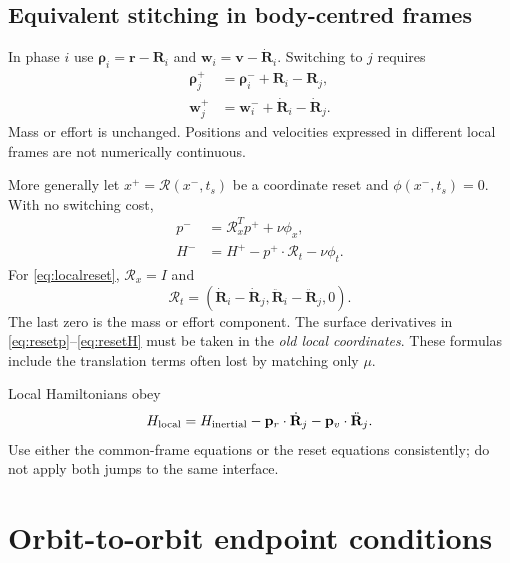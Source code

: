\documentclass[journal, a4paper]{IEEEtran}
\begin{document}
\subsection{Equivalent stitching in body-centred frames}
In phase $i$ use $\boldsymbol\rho_i=\mathbf r-\mathbf R_i$ and $\mathbf w_i=\mathbf v-\dot{\mathbf R}_i$. Switching to $j$ requires
\begin{align}
 \boldsymbol\rho_j^+&=\boldsymbol\rho_i^-+\mathbf R_i-\mathbf R_j,\nonumber\\
 \mathbf w_j^+&=\mathbf w_i^-+\dot{\mathbf R}_i-\dot{\mathbf R}_j.
 \label{eq:localreset}
\end{align}
Mass or effort is unchanged. Positions and velocities expressed in different local frames are not numerically continuous.

More generally let $x^+=\mathcal R(x^-,t_s)$ be a coordinate reset and $\phi(x^-,t_s)=0$. With no switching cost,
\begin{align}
 p^-&=\mathcal R_x^T p^++\nu\phi_x,\label{eq:resetp}\\
 H^-&=H^+-p^+\cdot\mathcal R_t-\nu\phi_t.
 \label{eq:resetH}
\end{align}
For \eqref{eq:localreset}, $\mathcal R_x=I$ and
\begin{equation}
 \mathcal R_t=(\dot{\mathbf R}_i-\dot{\mathbf R}_j,
                   \ddot{\mathbf R}_i-\ddot{\mathbf R}_j,0).
\end{equation}
The last zero is the mass or effort component. The surface derivatives in \eqref{eq:resetp}--\eqref{eq:resetH} must be taken in the \emph{old local coordinates}. These formulas include the translation terms often lost by matching only $\mu$.

Local Hamiltonians obey
\begin{equation}
 H_{\rm local}=H_{\rm inertial}
       -\mathbf p_r\cdot\dot{\mathbf R}_j
       -\mathbf p_v\cdot\ddot{\mathbf R}_j.
\end{equation}
Use either the common-frame equations or the reset equations consistently; do not apply both jumps to the same interface.

\section{Orbit-to-orbit endpoint conditions}
\end{document}
